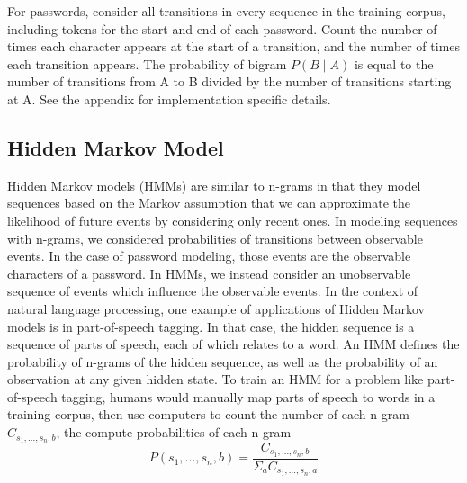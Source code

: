 \documentclass{amsart}
\theoremstyle{definition}
\theoremstyle{remark}
\numberwithin{equation}{section}
\begin{document}
For passwords, consider all transitions in every sequence in the training corpus, including tokens for the start and end of each password. Count the number of times each character appears at the start of a transition, and the number of times each transition appears. The probability of bigram $P(B \mid A)$ is equal to the number of transitions from A to B divided by the number of transitions starting at A. See the appendix for implementation specific details.

\subsection{Hidden Markov Model}
Hidden Markov models (HMMs) are similar to n-grams in that they model sequences based on the Markov assumption that we can approximate the likelihood of future events by considering only recent ones. In modeling sequences with n-grams, we considered probabilities of transitions between observable events. In the case of password modeling, those events are the observable characters of a password. In HMMs, we instead consider an unobservable sequence of events which influence the observable events. In the context of natural language processing, one example of applications of Hidden Markov models is in part-of-speech tagging. In that case, the hidden sequence is a sequence of parts of speech, each of which relates to a word. An HMM defines the probability of n-grams of the hidden sequence, as well as the probability of an observation at any given hidden state. To train an HMM for a problem like part-of-speech tagging, humans would manually map parts of speech to words in a training corpus, then use computers to count the number of each n-gram $C_{s_1,...,s_n,b}$, the compute probabilities of each n-gram 
$$P(s_1,...,s_n,b) = \frac{C_{s_1,...,s_n,b}}{\Sigma_a C_{s_1,...,s_n,a}}$$
\end{document}
